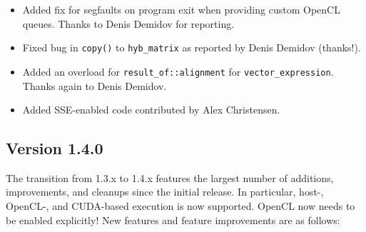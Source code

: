 \begin{itemize}
 \item Added fix for segfaults on program exit when providing custom OpenCL queues. Thanks to Denis Demidov for reporting.
 \item Fixed bug in \lstinline|copy()| to \lstinline|hyb_matrix| as reported by Denis Demidov (thanks!).
 \item Added an overload for \lstinline|result_of::alignment| for \lstinline|vector_expression|. Thanks again to Denis Demidov.
 \item Added SSE-enabled code contributed by Alex Christensen.
\end{itemize}



\subsection*{Version 1.4.0}
The transition from 1.3.x to 1.4.x features the largest number of additions, improvements, and cleanups since the initial release.
In particular, host-, OpenCL-, and CUDA-based execution is now supported. OpenCL now needs to be enabled explicitly!
New features and feature improvements are as follows:
